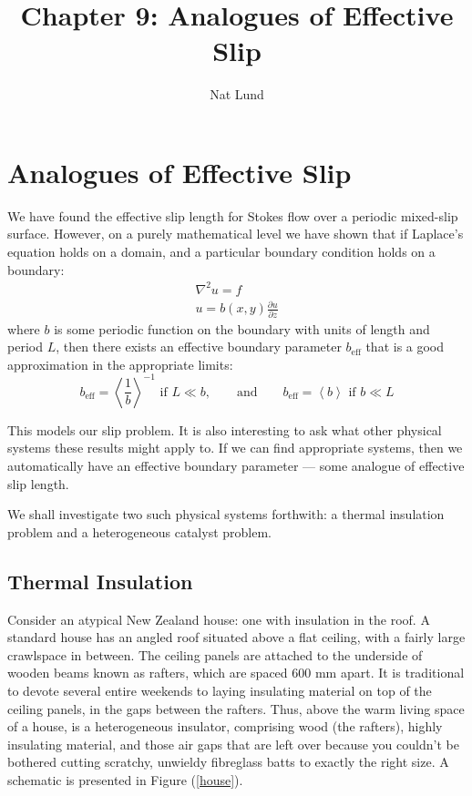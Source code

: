 \documentclass[12pt, a4paper, twoside, openright]{book}
\title{Chapter 9: Analogues of Effective Slip}
\author{Nat Lund}
\newcommand{\beff}{\ensuremath{b_{\mathrm{eff}}}}
\begin{document}
\chapter{Analogues of Effective Slip}\label{C:analogs}

We have found the effective slip length for Stokes flow over a periodic mixed-slip surface.  However, on a purely mathematical level we have shown that if Laplace's equation holds on a domain, and a particular boundary condition holds on a boundary:
\begin{gather}
\nabla^2 u = f \\
u = b(x,y) \frac{\partial u}{\partial z}
\end{gather}
where $b$ is some periodic function on the boundary with units of length and period $L$,
then there exists an effective boundary parameter $\beff$ that is a good approximation in the appropriate limits:
\begin{equation}
\beff = \left< \frac{1}{b} \right>^{-1} \text{   if   } L \ll b, \qquad \text{and} \qquad
\beff = \left< b \right> \text{   if   } b \ll L
\end{equation}


This models our slip problem.  It is also interesting to ask what other physical systems these results might apply to.  If we can find appropriate systems, then we automatically have an effective boundary parameter --- some analogue of effective slip length.

We shall investigate two such physical systems forthwith: a thermal insulation problem and a heterogeneous catalyst problem.


\section{Thermal Insulation}

Consider an atypical New Zealand house: one with insulation in the roof.  A standard house has an angled roof situated above a flat ceiling, with a fairly large crawlspace in between.  The ceiling panels are attached to the underside of wooden beams known as rafters, which are spaced 600 mm apart.  It is traditional to devote several entire weekends to laying insulating material on top of the ceiling panels, in the gaps between the rafters.
Thus, above the warm living space of a house, is a heterogeneous insulator, comprising wood (the rafters), highly insulating material, and those air gaps that are left over because you couldn't be bothered cutting scratchy, unwieldy fibreglass batts to exactly the right size.  A schematic is presented in Figure (\ref{house}).
\end{document}
